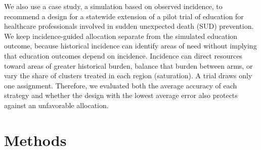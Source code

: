 \documentclass[Afour,sagev,times]{sagej}
\begin{document}
We also use a case study, a simulation based on observed incidence, to recommend a design for a statewide extension of a pilot trial of education for healthcare professionals involved in sudden unexpected death (SUD) prevention. We keep incidence-guided allocation separate from the simulated education outcome, because historical incidence can identify areas of need without implying that education outcomes depend on incidence. Incidence can direct resources toward areas of greater historical burden, balance that burden between arms, or vary the share of clusters treated in each region (saturation). A trial draws only one assignment. Therefore, we evaluated both the average accuracy of each strategy and whether the design with the lowest average error also protects against an unfavorable allocation.

\section{Methods}
\end{document}
